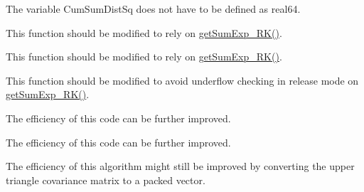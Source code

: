 \begin{DoxyRefList}
\label{todo__todo000009}%
%
 The variable {\ttfamily Cum\+Sum\+Dist\+Sq} does not have to be defined as {\ttfamily real64}. 
\item[Subprogram \mbox{\hyperlink{namespaceMath__mod_aca2a61850d983f469ecb90acc253a58c}{Math\+\_\+mod\+::get\+Log\+Sum\+Exp\+\_\+\+CK}} (Log\+Value, max\+Log\+Value)]\label{todo__todo000011}%
%
 This function should be modified to rely on {\ttfamily \mbox{\hyperlink{namespaceMath__mod_a3974fffdcda7a33913960e0999a34b96}{get\+Sum\+Exp\+\_\+\+RK()}}}.  
\item[Subprogram \mbox{\hyperlink{namespaceMath__mod_a19c8ee19b0f93d3586bf2de1c464f249}{Math\+\_\+mod\+::get\+Log\+Sum\+Exp\+\_\+\+RK}} (Log\+Value, max\+Log\+Value)]\label{todo__todo000010}%
%
 This function should be modified to rely on {\ttfamily \mbox{\hyperlink{namespaceMath__mod_a3974fffdcda7a33913960e0999a34b96}{get\+Sum\+Exp\+\_\+\+RK()}}}.  
\item[Subprogram \mbox{\hyperlink{namespaceMath__mod_a3974fffdcda7a33913960e0999a34b96}{Math\+\_\+mod\+::get\+Sum\+Exp\+\_\+\+RK}} (Log\+Value, max\+Log\+Value)]\label{todo__todo000012}%
%
 This function should be modified to avoid underflow checking in release mode on {\ttfamily \mbox{\hyperlink{namespaceMath__mod_a3974fffdcda7a33913960e0999a34b96}{get\+Sum\+Exp\+\_\+\+RK()}}}.  
\item[Subprogram \mbox{\hyperlink{namespaceSample__mod_a1942971b64332fc7c4860112a244764c}{Sample\+\_\+mod\+::get\+Cho\+Low\+Cov\+Upp}} (nd, np, Mean, Sample, Cho\+Low\+Cov\+Upp, Cho\+Dia)]\label{todo__todo000016}%
%
 The efficiency of this code can be further improved.  
\item[Subprogram \mbox{\hyperlink{namespaceSample__mod_a1e5daab49859d9c21c4ec3c916ec963d}{Sample\+\_\+mod\+::get\+Cho\+Low\+Cov\+Upp\+High\+Dim}} (nd, np, Mean, Sample, Cho\+Low\+Cov\+Upp, Cho\+Dia)]\label{todo__todo000017}%
%
 The efficiency of this code can be further improved.  
\item[Subprogram \mbox{\hyperlink{namespaceSample__mod_ab6c8a951bf35c59402a30d6d17a6d193}{Sample\+\_\+mod\+::merge\+Mean\+Cov\+Upp}} (nd, npA, MeanA, Cov\+UppA, npB, MeanB, Cov\+UppB, Mean\+AB, Cov\+Upp\+AB)]\label{todo__todo000018}%
%
 The efficiency of this algorithm might still be improved by converting the upper triangle covariance matrix to a packed vector. 
\item[Subprogram \mbox{\hyperlink{namespaceSample__mod_a81524ddc27a48db65744d80cfad9b348}{Sample\+\_\+mod\+::merge\+Mean\+Cov\+Upp\+Dense}} (nd, npA, MeanA, Cov\+UppA, npB, MeanB, Cov\+UppB)]\label{todo__todo000019}%

\end{DoxyRefList}
